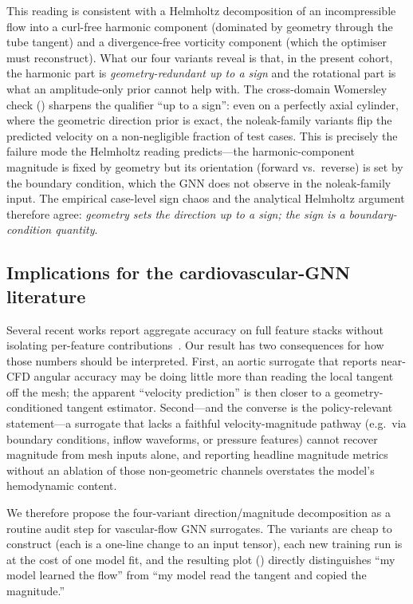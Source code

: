 \documentclass[10pt,a4paper]{article}
\begin{document}
This reading is consistent with a Helmholtz decomposition of an
incompressible flow into a curl-free harmonic component (dominated by
geometry through the tube tangent) and a divergence-free vorticity
component (which the optimiser must reconstruct). What our four
variants reveal is that, in the present cohort, the harmonic part is
\emph{geometry-redundant up to a sign} and the rotational part is
what an amplitude-only prior cannot help with. The cross-domain
Womersley check () sharpens the qualifier
``up to a sign'': even on a perfectly axial cylinder, where the
geometric direction prior is exact, the noleak-family variants
flip the predicted velocity on a non-negligible fraction of test
cases. This is precisely the failure mode the Helmholtz reading
predicts---the harmonic-component magnitude is fixed by geometry
but its orientation (forward vs.\ reverse) is set by the boundary
condition, which the GNN does not observe in the noleak-family
input. The empirical case-level sign chaos and the analytical
Helmholtz argument therefore agree: \emph{geometry sets the
direction up to a sign; the sign is a boundary-condition quantity}.

\subsection*{Implications for the cardiovascular-GNN literature}

Several recent works report aggregate accuracy on full feature stacks
without isolating per-feature
contributions~\cite{suk2024gemgcn,suk2024labgatr,tabe2026pignn,wang2026npj,pegolotti2024}.
Our result has two consequences for how those numbers should be
interpreted. First, an aortic surrogate that reports near-CFD angular
accuracy may be doing little more than reading the local tangent off
the mesh; the apparent ``velocity prediction'' is then closer to a
geometry-conditioned tangent estimator. Second---and the converse is
the policy-relevant statement---a surrogate that lacks a faithful
velocity-magnitude pathway (e.g.\ via boundary conditions, inflow
waveforms, or pressure features) cannot recover magnitude from mesh
inputs alone, and reporting headline magnitude metrics without an
ablation of those non-geometric channels overstates the model's
hemodynamic content.

We therefore propose the four-variant direction/magnitude
decomposition as a routine audit step for vascular-flow GNN
surrogates. The variants are cheap to construct (each is a one-line
change to an input tensor), each new training run is at the cost of
one model fit, and the resulting plot
() directly distinguishes
``my model learned the flow'' from ``my model read the tangent and
copied the magnitude.''
\end{document}
